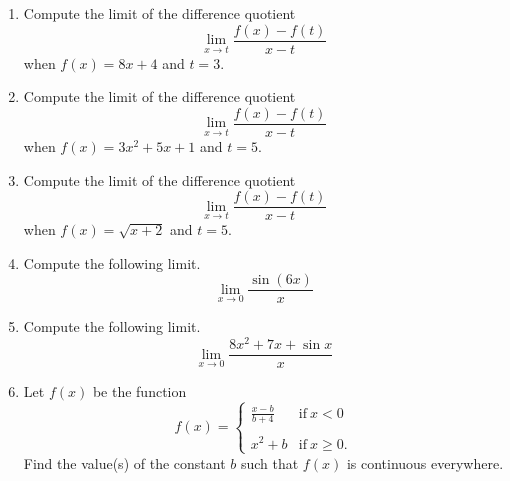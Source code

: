 \documentclass{article}
\begin{document}
\ActivityTitle[class=Calculus I, number=2, name=Continuity]

\begin{enumerate}
\item Compute the limit of the difference quotient \[ \lim_{x \rightarrow t} \frac{f(x) - f(t)}{x - t} \] when $f(x) = 8 x + 4$ and $t = 3$.



  
\vspace{5cm}

\item Compute the limit of the difference quotient \[ \lim_{x \rightarrow t} \frac{f(x) - f(t)}{x - t} \] when $f(x) = 3 x^2 + 5 x + 1$ and $t = 5$.



  
\vspace{5cm}

\item Compute the limit of the difference quotient \[ \lim_{x \rightarrow t} \frac{f(x) - f(t)}{x - t} \] when $f(x) = \sqrt{x + 2}$ and $t = 5$.



  
\vspace{5cm}

\item Compute the following limit. \[ \lim_{x \rightarrow 0} \frac{\sin(6 x)}{x} \]



  
\vspace{5cm}

\item Compute the following limit. \[ \lim_{x \rightarrow 0} \frac{8 x^2 + 7 x + \sin x}{x} \]



  
\vspace{5cm}

\item Let $f(x)$ be the function \[ f(x) = \left\{ \begin{array}{ll} \frac{x-b}{b + 4} & \mathrm{if}\ x < 0 \\ & \\ x^2 + b & \mathrm{if}\ x \geq 0. \end{array}\right. \] Find the value(s) of the constant $b$ such that $f(x)$ is continuous everywhere.



  
\vspace{5cm}
\end{enumerate}
\end{document}
